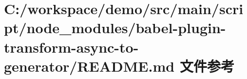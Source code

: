 \hypertarget{node__modules_2babel-plugin-transform-async-to-generator_2_r_e_a_d_m_e_8md}{}\section{C\+:/workspace/demo/src/main/script/node\+\_\+modules/babel-\/plugin-\/transform-\/async-\/to-\/generator/\+R\+E\+A\+D\+ME.md 文件参考}
\label{node__modules_2babel-plugin-transform-async-to-generator_2_r_e_a_d_m_e_8md}
